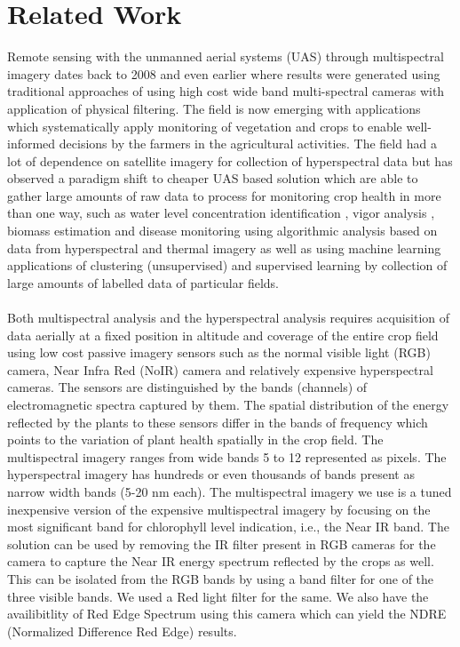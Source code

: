 \chapter{Related Work}
Remote sensing \cite{two} with the unmanned aerial systems (UAS) through multispectral imagery dates back to 2008 \cite{eight-icuas} and even earlier where results were generated using traditional approaches of using high cost wide band multi-spectral cameras with application of physical filtering. The field is now emerging with applications which systematically apply monitoring of vegetation and crops to enable well-informed decisions by the farmers in the agricultural activities. The field had a lot of dependence on satellite imagery for collection of hyperspectral data but has observed a paradigm shift to cheaper UAS based solution which are able to gather large amounts of raw data to process for monitoring crop health in more than one way, such as water level concentration identification \cite{two-remotev2}, vigor analysis \cite{three-remotev2}, biomass estimation and disease monitoring using algorithmic analysis based on data from hyperspectral and thermal imagery as well as using machine learning applications of clustering (unsupervised) and supervised learning by collection of large amounts of labelled data of particular fields.  
\\
\\
Both multispectral analysis and the hyperspectral analysis requires acquisition of data aerially at a fixed position in altitude and coverage of the entire crop field using low cost passive imagery sensors such as the normal visible light (RGB) camera, Near Infra Red (NoIR) camera and relatively expensive hyperspectral cameras. The sensors are distinguished by the bands (channels) of electromagnetic spectra captured by them. The spatial distribution of the energy reflected by the plants to these sensors differ in the bands of frequency which points to the variation of plant health spatially in the crop field. The multispectral imagery ranges from wide bands 5 to 12 represented as pixels. The hyperspectral imagery has hundreds or even thousands of bands present as narrow width bands (5-20 nm each). The multispectral imagery we use is a tuned inexpensive version of the expensive multispectral imagery by focusing on the most significant band for chlorophyll level indication, i.e., the Near IR band. The solution can be used by removing the IR filter present in RGB cameras for the camera to capture the Near IR energy spectrum reflected by the crops as well. This can be isolated from the RGB bands by using a band filter for one of the three visible bands. We used a Red light filter for the same. We also have the availibitlity of Red Edge Spectrum using this camera which can yield the NDRE (Normalized Difference Red Edge) results.
